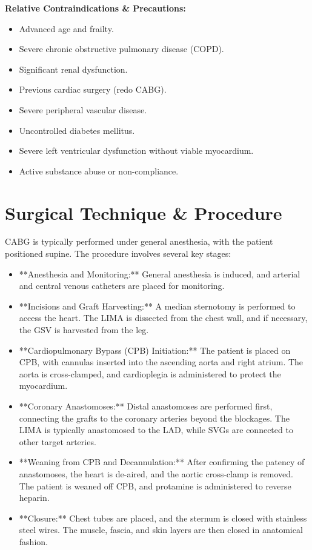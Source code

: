 \textbf{Relative Contraindications \& Precautions:}
\begin{itemize}
  \item Advanced age and frailty.
  \item Severe chronic obstructive pulmonary disease (COPD).
  \item Significant renal dysfunction.
  \item Previous cardiac surgery (redo CABG).
  \item Severe peripheral vascular disease.
  \item Uncontrolled diabetes mellitus.
  \item Severe left ventricular dysfunction without viable myocardium.
  \item Active substance abuse or non-compliance.
\end{itemize}

\section*{Surgical Technique \& Procedure}
CABG is typically performed under general anesthesia, with the patient positioned supine. The procedure involves several key stages:

\begin{itemize}
  \item **Anesthesia and Monitoring:** General anesthesia is induced, and arterial and central venous catheters are placed for monitoring.
  
  \item **Incisions and Graft Harvesting:** A median sternotomy is performed to access the heart. The LIMA is dissected from the chest wall, and if necessary, the GSV is harvested from the leg.

  \item **Cardiopulmonary Bypass (CPB) Initiation:** The patient is placed on CPB, with cannulas inserted into the ascending aorta and right atrium. The aorta is cross-clamped, and cardioplegia is administered to protect the myocardium.

  \item **Coronary Anastomoses:** Distal anastomoses are performed first, connecting the grafts to the coronary arteries beyond the blockages. The LIMA is typically anastomosed to the LAD, while SVGs are connected to other target arteries.

  \item **Weaning from CPB and Decannulation:** After confirming the patency of anastomoses, the heart is de-aired, and the aortic cross-clamp is removed. The patient is weaned off CPB, and protamine is administered to reverse heparin.

  \item **Closure:** Chest tubes are placed, and the sternum is closed with stainless steel wires. The muscle, fascia, and skin layers are then closed in anatomical fashion.
\end{itemize}

